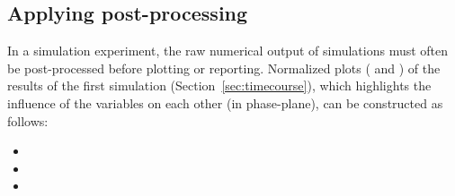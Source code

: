 \subsection{Applying post-processing}
\label{sec:postprocessing}
In a simulation experiment, the raw numerical output of simulations must often be post-processed before plotting or reporting. Normalized plots ( and ) of the results of the first simulation (Section~\ref{sec:timecourse}), which highlights the influence of the variables on each other (in phase-plane), can be constructed as follows:

\begin{itemize}
	\item{}
        \item{}
	\item{}
\end{itemize}

